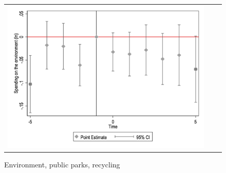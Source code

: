 \begin{figure}[!ht]
\begin{tabular}{@{}ccc@{}}
\begin{minipage}[t]{0.32\textwidth}
            \caption{Environment, public parks, recycling}
            \includegraphics[width=\linewidth]{images/pop_100000/eventdd_ln_q4_09_step1.jpg}
            \label{fig:environment}
        \end{minipage}
    \end{tabular}
\end{figure}
